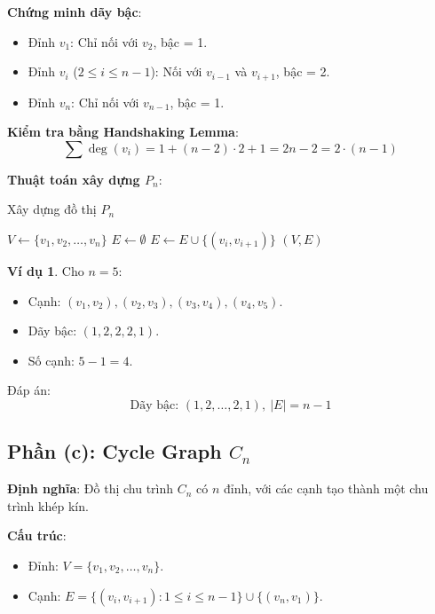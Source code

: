 \documentclass[a4paper,12pt]{article}
\theoremstyle{plain}
\theoremstyle{definition}
\newtheorem{example}{Ví dụ}
\begin{document}
\textbf{Chứng minh dãy bậc}:
\begin{itemize}
    \item Đỉnh \( v_1 \): Chỉ nối với \( v_2 \), bậc = 1.
    \item Đỉnh \( v_i \) (\( 2 \leq i \leq n-1 \)): Nối với \( v_{i-1} \) và \( v_{i+1} \), bậc = 2.
    \item Đỉnh \( v_n \): Chỉ nối với \( v_{n-1} \), bậc = 1.
\end{itemize}

\textbf{Kiểm tra bằng Handshaking Lemma}:
\[
\sum \deg(v_i) = 1 + (n-2) \cdot 2 + 1 = 2n - 2 = 2 \cdot (n-1)
\]

\textbf{Thuật toán xây dựng \( P_n \)}:
\begin{algorithm}
\caption{Xây dựng đồ thị \( P_n \)}
\begin{algorithmic}
    \State $V \gets \{v_1, v_2, \ldots, v_n\}$
    \State $E \gets \emptyset$
        \State $E \gets E \cup \{(v_i, v_{i+1})\}$
    \EndFor
    \State \Return $(V, E)$
\EndFunction
\end{algorithmic}
\end{algorithm}

\begin{example}
Cho \( n=5 \):
\begin{itemize}
    \item Cạnh: \( (v_1, v_2), (v_2, v_3), (v_3, v_4), (v_4, v_5) \).
    \item Dãy bậc: \( (1, 2, 2, 2, 1) \).
    \item Số cạnh: \( 5-1 = 4 \).
\end{itemize}
\end{example}

Đáp án:
\[
\boxed{\text{Dãy bậc: } (1, 2, \ldots, 2, 1), \ |E| = n-1}
\]

\subsection*{Phần (c): Cycle Graph \( C_n \)}

\textbf{Định nghĩa}: Đồ thị chu trình \( C_n \) có \( n \) đỉnh, với các cạnh tạo thành một chu trình khép kín.

\textbf{Cấu trúc}:
\begin{itemize}
    \item Đỉnh: \( V = \{v_1, v_2, \ldots, v_n\} \).
    \item Cạnh: \( E = \{(v_i, v_{i+1}) : 1 \leq i \leq n-1\} \cup \{(v_n, v_1)\} \).
\end{itemize}
\end{document}
